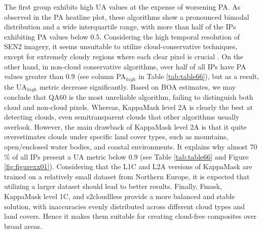\documentclass[a4paper, nobind]{templates/cdethesis}
\begin{document}
The first group exhibits high UA values at the expense of worsening PA. As observed in the PA heatline plot, these algorithms show a pronounced bimodal distribution and a wide interquartile range, with more than half of the IPs exhibiting PA values below 0.5. Considering the high temporal resolution of SEN2 imagery, it seems unsuitable to utilize cloud-conservative techniques, except for extremely cloudy regions where each clear pixel is crucial \cite{CMIX}. On the other hand, in non-cloud conservative algorithms, over half of all IPs have PA values greater than 0.9 (see column PA\(_{high}\) in Table \ref{tab:table66}), but as a result, the UA\(_{high}\) metric decrease significantly. Based on BOA estimates, we may conclude that QA60 is the most unreliable algorithm, failing to distinguish both cloud and non-cloud pixels. Whereas, KappaMask level 2A is clearly the best at detecting clouds, even semitransparent clouds that other algorithms usually overlook. However, the main drawback of KappaMask level 2A is that it quite overestimates clouds under specific land cover types, such as mountains, open/enclosed water bodies, and coastal environments. It explains why almost 70 \% of all IPs present a UA metric below 0.9 (see Table \ref{tab:table66} and Figure \ref{fig:figurexx01}). Considering that the L1C and L2A versions of KappaMask are trained on a relatively small dataset from Northern Europe, it is expected that utilizing a larger dataset should lead to better results. Finally, Fmask, KappaMask level 1C, and s2cloudlless provide a more balanced and stable solution, with inaccuracies evenly distributed across different cloud types and land covers. Hence it makes them suitable for creating cloud-free composites over broad areas.
\end{document}
